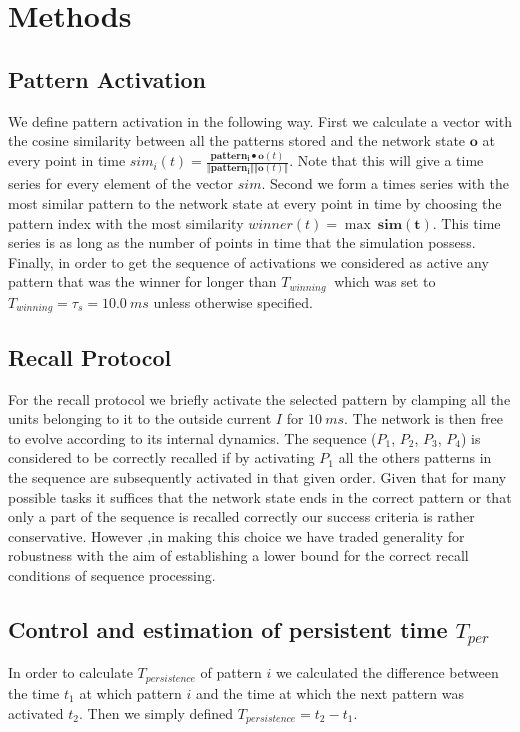\documentclass[10pt,a4paper]{article}
\begin{document}
\section{Methods}

\subsection{Pattern Activation}
We define pattern activation in the following way. First we calculate a vector with the cosine similarity between all the patterns stored and the network state $\mathbf{o}$ at every point in time $sim_i(t) = \frac{\mathbf{pattern_i} \bullet  \mathbf{o}(t)}{\Vert \mathbf{pattern_i} \Vert \Vert \mathbf{o}(t) \Vert}$. Note that this will give a time series for every element of the vector $sim$. Second we form a times series with the most similar pattern to the network state at every point in time by choosing the pattern index with the most similarity $winner(t) = \max \: \mathbf{sim(t)}$. This time series is as long as the number of points in time that the simulation possess. Finally, in order to get the sequence of activations we considered as active any pattern that was the winner for longer than  $T_{winning} \:$ which was set to $T_{winning} = \tau_s = 10.0 \: ms$ unless otherwise specified.   

\subsection{Recall Protocol}
For the recall protocol we briefly activate the selected pattern by clamping all the units belonging to it to the outside current $I$ for $10 \: ms$. The network is then free to evolve according to its internal dynamics. The sequence ($P_1$, $P_2$, $P_3$, $P_4$) is considered to be correctly recalled if by activating $P_1$ all the others patterns in the sequence are subsequently activated in that given order. Given that for many possible tasks it suffices that the network state ends in the correct pattern or that only a part of the sequence is recalled correctly our success criteria is rather conservative. However ,in making this choice we have traded generality for robustness with the aim of establishing a lower bound for the correct recall conditions of sequence processing.


\subsection{Control and estimation of persistent time $T_{per}$}
In order to calculate $T_{persistence}$ of pattern $i$ we calculated the difference between the time $t_1$ at which pattern $i$ and the time at which the next pattern was activated $t_2$. Then we simply defined $T_{persistence} = t_2 - t_1$.
\end{document}
